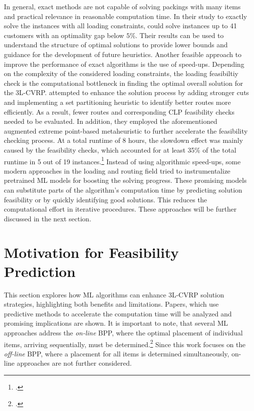 In general, exact methods are not capable of solving packings with many items and practical relevance
in reasonable computation time. In their study to exactly solve the \gendreauDataSetText instances with all loading constraints,
\cite{tamke_branch-and-cut_2024} could solve instances up to 41 customers with an optimality
gap below $5 \%$. Their results can be used to understand the structure
of optimal solutions to provide lower bounds and guidance for the development of future
heuristics. Another feasible approach to improve
the performance of exact algorithms is the use of speed-ups. Depending on the complexity of
the considered loading constraints, the loading feasibiltiy check is the computational
bottleneck in finding the optimal overall solution for the \gls{3L-CVRP}. \textcite{tamke_branch-and-cut_2024} attempted
to enhance the solution process by adding stronger cuts and implementing a set partitioning heuristic to identify better routes
more efficiently. As a result, fewer routes and corresponding CLP feasibility checks needed to be evaluated. In addition,
they employed the aforementioned augmented extreme point-based metaheuristic to further accelerate the feasibility checking process.
At a total runtime of 8 hours, the slowdown effect was mainly caused by the feasibility checks, which accounted for at least 35\%
of the total runtime in 5 out of 19 instances.\footcite[cf.][p. 2]{tamke_branch-and-cut_2024}
Instead of using algorithmic speed-ups, some modern approaches in the loading and routing field tried
to instrumentalize pretrained \gls{ML} models for boosting the solving progress.
These promising models can substitute parts of the algorithm's computation time by predicting solution
feasibility or by quickly identifying good solutions. This reduces the computational effort
in iterative procedures. These approaches will be further discussed in the next section.

\section{Motivation for Feasibility Prediction}
\label{sec:motivation_feasibility_prediction}
This section explores how \gls{ML} algorithms can enhance \gls{3L-CVRP} solution strategies,
highlighting both benefits and limitations. Papers, which use predictive methods to accelerate the computation time
will be analyzed and promising implications are shown. It is important to note, that
several \gls{ML} approaches address the \textit{on-line} \gls{BPP}, where the optimal placement
of individual items, arriving sequentially, must be determined.\footcite[cf.][p. 1]{ali_-line_2022}
Since this work focuses on the \textit{off-line} \gls{BPP}, where a placement for all items is determined
simultaneously, on-line approaches are not further considered.

